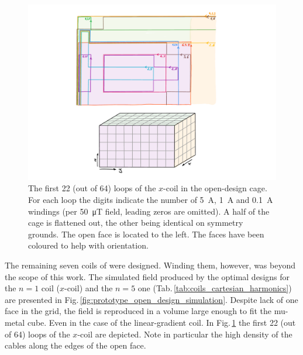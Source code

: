 \begin{figure}
  \centering
  \includegraphics[width=\linewidth]{gfx/prototype/open_design_Xcoil_coils.pdf}
  \caption{The first 22 (out of 64) loops of the $x$-coil in the open-design cage. For each loop the digits indicate the number of \SI{5}{\ampere}, \SI{1}{\ampere} and \SI{0.1}{\ampere} windings (per \SI{50}{\micro\tesla} field, leading zeros are omitted). A half of the cage is flattened out, the other being identical on symmetry grounds. The open face is located to the left. The faces have been coloured to help with orientation.}\label{fig:prototype_open_design_Xcoil_coils}
\end{figure}

The remaining seven coils of were designed. Winding them, however, was beyond the scope of this work.
The simulated field produced by the optimal designs for the $n = 1$ coil ($x$-coil) and the $n = 5$ one (Tab.\,\ref{tab:coils_cartesian_harmonics}) are presented in Fig.\,\ref{fig:prototype_open_design_simulation}.
Despite lack of one face in the grid, the field is reproduced in a volume large enough to fit the mu-metal cube. Even in the case of the linear-gradient coil. In Fig.\,\ref{fig:prototype_open_design_Xcoil_coils} the first 22 (out of 64) loops of the $x$-coil are depicted.
Note in particular the high density of the cables along the edges of the open face.

